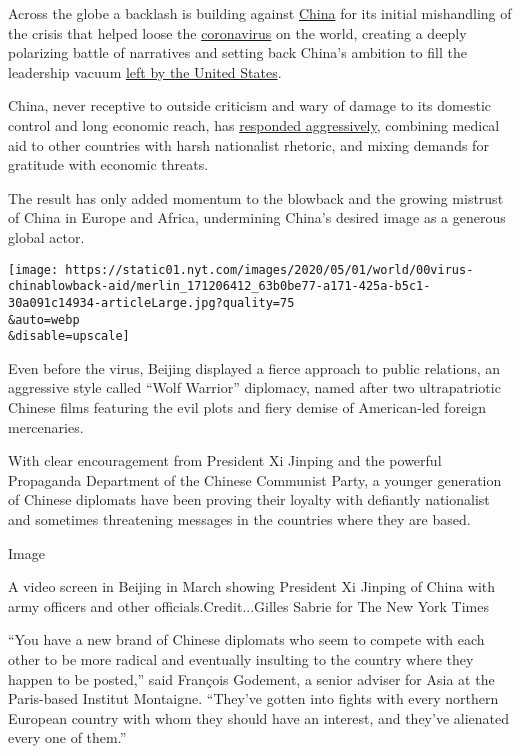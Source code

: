 Across the globe a backlash is building against
\href{https://www.nytimes.com/2020/05/11/world/australia/coronavirus-china-inquiry.html}{China}
for its initial mishandling of the crisis that helped loose the
\href{https://www.nytimes.com/2020/05/21/business/economy/coronavirus-china-economy.html}{coronavirus}
on the world, creating a deeply polarizing battle of narratives and
setting back China's ambition to fill the leadership vacuum
\href{https://www.nytimes.com/2020/05/03/us/coronavirus-updates.html}{left
by the United States}.

China, never receptive to outside criticism and wary of damage to its
domestic control and long economic reach, has
\href{https://www.nytimes.com/2020/05/11/world/australia/coronavirus-china-inquiry.html}{responded
aggressively}, combining medical aid to other countries with harsh
nationalist rhetoric, and mixing demands for gratitude with economic
threats.

The result has only added momentum to the blowback and the growing
mistrust of China in Europe and Africa, undermining China's desired
image as a generous global actor.

\texttt{[image: https://static01.nyt.com/images/2020/05/01/world/00virus-chinablowback-aid/merlin\_171206412\_63b0be77-a171-425a-b5c1-30a091c14934-articleLarge.jpg?quality=75\\\&auto=webp\\\&disable=upscale]}

Even before the virus, Beijing displayed a fierce approach to public
relations, an aggressive style called ``Wolf Warrior'' diplomacy, named
after two ultrapatriotic Chinese films featuring the evil plots and
fiery demise of American-led foreign mercenaries.

With clear encouragement from President Xi Jinping and the powerful
Propaganda Department of the Chinese Communist Party, a younger
generation of Chinese diplomats have been proving their loyalty with
defiantly nationalist and sometimes threatening messages in the
countries where they are based.

Image

A video screen in Beijing in March showing President Xi Jinping of China
with army officers and other officials.Credit...Gilles Sabrie for The
New York Times

``You have a new brand of Chinese diplomats who seem to compete with
each other to be more radical and eventually insulting to the country
where they happen to be posted,'' said François Godement, a senior
adviser for Asia at the Paris-based Institut Montaigne. ``They've gotten
into fights with every northern European country with whom they should
have an interest, and they've alienated every one of them.''

